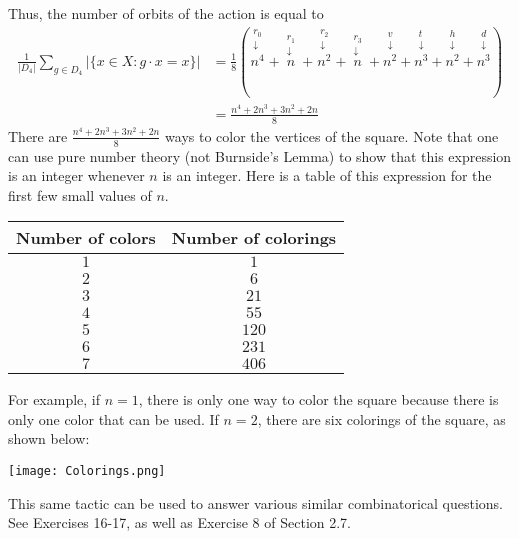 \documentclass[leqno]{book}
\begin{document}
Thus, the number of orbits of the action is equal to
\begin{align*}
\frac 1{|D_4|}\sum_{g\in D_4}|\{x\in X:g\cdot x=x\}|&=\frac 18(\overset{\begin{matrix}r_0\\\downarrow\end{matrix}}{n^4}
+\overset{\begin{matrix}r_1\\\downarrow\end{matrix}}{n}
+\overset{\begin{matrix}r_2\\\downarrow\end{matrix}}{n^2}
+\overset{\begin{matrix}r_3\\\downarrow\end{matrix}}{n}
+\overset{\begin{matrix}v\\\downarrow\end{matrix}}{n^2}
+\overset{\begin{matrix}t\\\downarrow\end{matrix}}{n^3}
+\overset{\begin{matrix}h\\\downarrow\end{matrix}}{n^2}
+\overset{\begin{matrix}d\\\downarrow\end{matrix}}{n^3})\\&=\frac{n^4+2n^3+3n^2+2n}8
\end{align*}
There are $\frac{n^4+2n^3+3n^2+2n}8$ ways to color the vertices of the square.  Note that one can use pure number theory (not Burnside's Lemma) to show that this expression is an integer whenever $n$ is an integer.  Here is a table of this expression for the first few small values of $n$.
\begin{center}
\begin{tabular}{c|c}
Number of colors & Number of colorings\\\hline
$1$ & $1$\\
$2$ & $6$\\
$3$ & $21$\\
$4$ & $55$\\
$5$ & $120$\\
$6$ & $231$\\
$7$ & $406$
\end{tabular}
\end{center}
For example, if $n=1$, there is only one way to color the square because there is only one color that can be used.  If $n=2$, there are six colorings of the square, as shown below:
\begin{center}\texttt{[image: Colorings.png]}\end{center}
This same tactic can be used to answer various similar combinatorical questions.  See Exercises 16-17, as well as Exercise 8 of Section 2.7.
\end{document}

